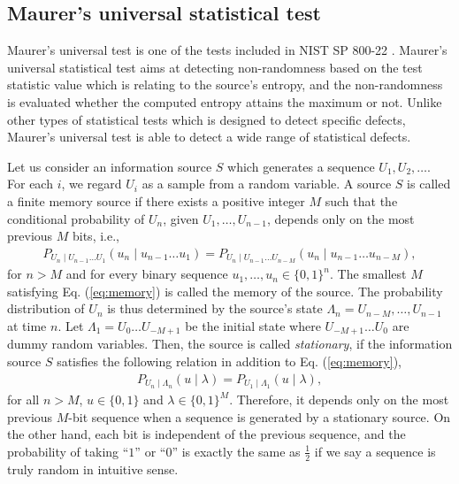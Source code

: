 \subsection{Maurer's universal statistical test}
Maurer's universal test is one of the tests included in NIST SP 800-22 \cite{rukhin2001statistical,bassham2010sp}.
Maurer's universal statistical test aims at detecting non-randomness based on the test statistic value which is relating to the source's entropy, and the non-randomness is evaluated whether the computed entropy attains the maximum or not. 
%
Unlike other types of statistical tests which is designed to detect specific defects, Maurer's universal test is able to detect a wide range of statistical defects.
%
\par
Let us consider an information source $S$ which generates a sequence $U_1,U_2,\dots$. For each $i$, we regard $U_i$ as a sample from a random variable.
A source $S$ is called a finite memory source if there exists a positive integer $M$ such that the conditional probability of $U_n$, given $U_1,\dots,U_{n-1}$, depends only on the most previous $M$ bits, i.e.,
\begin{align}\label{eq:memory}
	P_{U_n\mid U_{n-1}\dots U_{1}}(u_n \mid u_{n-1}\dots u_{1}) = P_{U_n\mid U_{n-1}\dots U_{n-M}}(u_n \mid u_{n-1}\dots u_{n-M}),
\end{align}
for $n>M$ and for every binary sequence $u_1,\dots,u_n\in\{0,1\}^n$. The smallest $M$ satisfying Eq. (\ref{eq:memory}) is called the memory of the source. The probability distribution of $U_n$ is thus determined by the source's state $\Lambda_n = U_{n-M},\dots,U_{n-1}$ at time $n$. Let $\Lambda_1 = U_0 \dots U_{-M+1}$ be the initial state where $U_{-M+1}\dots U_0$ are dummy random variables. Then, the source is called \textit{stationary}, if the information source $S$ satisfies the following relation in addition to Eq. (\ref{eq:memory}),
\begin{align}
	P_{U_n\mid\Lambda_n}(u\mid \lambda) = P_{U_1\mid\Lambda_1}(u\mid \lambda),
\end{align}
for all $n>M$, $u\in\{0,1\}$ and $\lambda \in \{0,1\}^M$. 
%
Therefore, it depends only on the most previous $M$-bit sequence when a sequence is generated by a stationary source.
%
On the other hand, each bit is independent of the previous sequence, and the probability of taking ``$1$'' or ``$0$'' is exactly the same as $\frac{1}{2}$ if we say a sequence is truly random in intuitive sense.
%
\par
%

